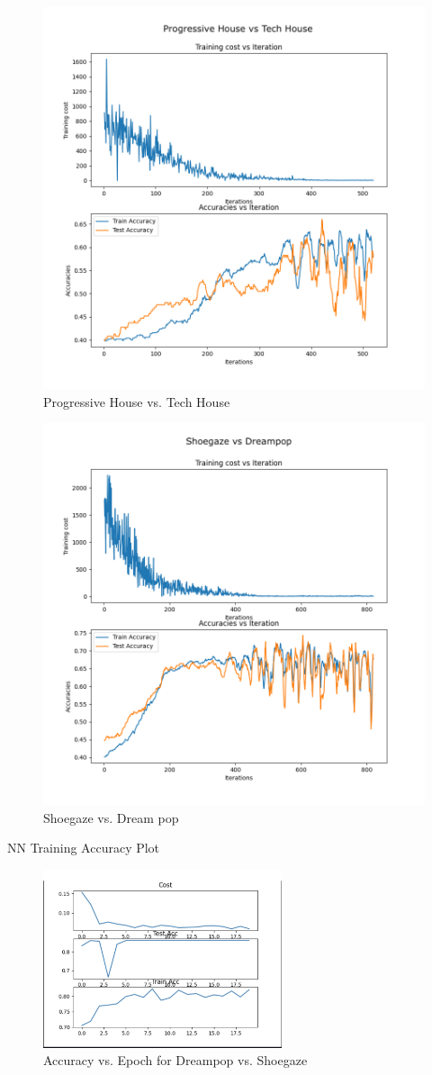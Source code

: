 \documentclass[letterpaper, 12 pt, conference]{ieeeconf}  %
\begin{document}
\begin{figure}[H]
\centering
\includegraphics[width=.75\linewidth]{phth_svm.png}
\caption{Progressive House vs. Tech House}
\label{fig:svmtrain3}
\end{figure}
\begin{figure}[H]
\centering
\includegraphics[width=.75\linewidth]{sgdp_svm.png}
\caption{Shoegaze vs. Dream pop}
\label{fig:svmtrain4}
\end{figure}

\par NN Training Accuracy Plot
\begin{figure}[H]
\centering
\includegraphics[width=7cm]{nn_train.png}
\caption{Accuracy vs. Epoch for Dreampop vs. Shoegaze}
\label{fig:nn_acc}
\end{figure}
\end{document}
